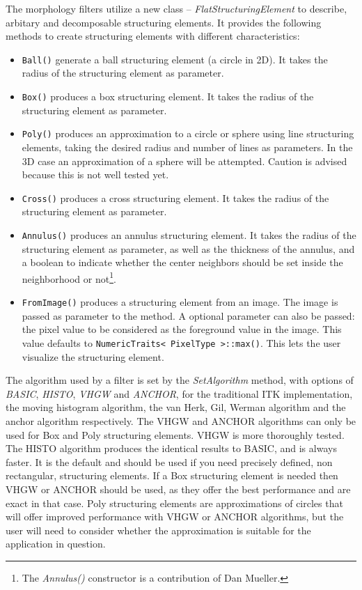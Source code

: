 \documentclass{InsightArticle}
\begin{document}
The morphology filters utilize a new class -- {\em
FlatStructuringElement} to describe, arbitary and decomposable
structuring elements. It provides the following methods to create
structuring elements with different characteristics:
\begin{itemize}
  \item \verb$Ball()$ generate a ball structuring element (a circle in 2D). It takes the 
	radius of the structuring element as parameter.
  \item \verb$Box()$ produces a box structuring element. It takes the radius 
	of the structuring element as parameter.
  \item \verb$Poly()$ produces an approximation to a circle or sphere using 
	line structuring elements, taking the desired radius and number of 
	lines as parameters. In the 3D case an approximation of a sphere will 
	be attempted. Caution is advised because this is not well tested yet.
  \item \verb$Cross()$ produces a cross structuring element. It takes the radius 
	of the structuring element as parameter.
  \item \verb$Annulus()$ produces an annulus structuring element. It takes the radius 
	of the structuring element as parameter, as well as the thickness of the annulus,
	and a boolean to indicate whether the center neighbors should be set inside the
	neighborhood or not\footnote{The {\em Annulus()} constructor  is a contribution
of Dan Mueller.}.
  \item \verb$FromImage()$ produces a structuring element from an image. The image is passed
as parameter to the method. A optional parameter can also be passed: the pixel value
to be considered as the foreground value in the image. This value defaults to
\verb$NumericTraits< PixelType >::max()$. This lets the user visualize the structuring element.
\end{itemize}

The algorithm used by a filter is set by the {\em SetAlgorithm}
method, with options of {\em BASIC}, {\em HISTO}, {\em VHGW} and {\em
ANCHOR}, for the traditional ITK implementation, the moving histogram
algorithm, the van Herk, Gil, Werman algorithm and the anchor
algorithm respectively. The VHGW and ANCHOR algorithms can only be
used for Box and Poly structuring elements. VHGW is more thoroughly
tested. The HISTO algorithm produces the identical results to BASIC,
and is always faster. It is the default and should be used if you need
precisely defined, non rectangular, structuring elements. If a Box
structuring element is needed then VHGW or ANCHOR should be used, as
they offer the best performance and are exact in that case. Poly
structuring elements are approximations of circles that will offer
improved performance with VHGW or ANCHOR algorithms, but the user will
need to consider whether the approximation is suitable for the
application in question.
\end{document}

